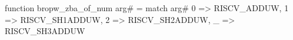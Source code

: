 function bropw_zba_of_num arg# = match arg# {
  0 => RISCV_ADDUW,
  1 => RISCV_SH1ADDUW,
  2 => RISCV_SH2ADDUW,
  _ => RISCV_SH3ADDUW
}
